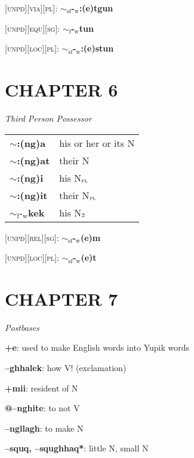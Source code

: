 \documentclass{article}
\begin{document}
\textsc{[unpd][via][pl]}: \textbf{$\sim_\text{sf}$-$_\text{w}$:(e)tgun}

\textsc{[unpd][equ][sg]}: \textbf{$\sim_\text{f}$-$_\text{w}$tun}

\textsc{[unpd][loc][pl]}: \textbf{$\sim_\text{sf}$-$_\text{w}$:(e)stun}

\section{CHAPTER 6}

\textit{Third Person Possessor} \\
\begin{tabular}{ l l }
\textbf{$\sim$:(ng)a} & his or her or its N \\
\textbf{$\sim$:(ng)at} & their N \\
\textbf{$\sim$:(ng)i} & his N$_\text{\textsc{pl}}$ \\
\textbf{$\sim$:(ng)it} & their N$_\text{\textsc{pl}}$ \\
\textbf{${\sim}_\text{f}\text{-}_\text{w}$kek} & his N$_\text{\textsc{2}}$ \\
\end{tabular}

\bigskip

\textsc{[unpd][rel][sg]}: \textbf{$\sim_\text{sf}$-$_\text{w}$(e)m}

\textsc{[unpd][loc][pl]}: \textbf{$\sim_\text{sf}$-$_\text{w}$(e)t}

\section{CHAPTER 7}

\textit{Postbases}
\begin{description}
\item \textbf{+e}: used to make English words into Yupik words
\item \textbf{--ghhalek}: how V! (exclamation)
\item \textbf{+mii}: resident of N
\item \textbf{@--nghite}: to not V
\item \textbf{--ngllagh}: to make N
\item \textbf{--squq, --squghhaq*}: little N, small N
\end{description}
\end{document}
